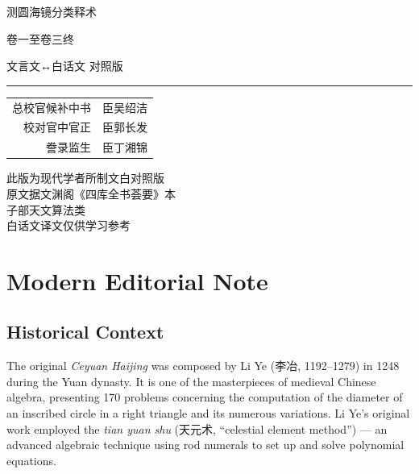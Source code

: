 \documentclass[11pt,a4paper]{article}
\newcommand{\shortline}{\noindent\rule{0.5\textwidth}{0.4pt}\par}
\newcounter{problem}[section]
\begin{document}
\thispagestyle{empty}
\begin{center}
\vspace*{3cm}
{\Large 测圆海镜分类释术}

\vspace{0.5cm}
{\large 卷一至卷三终}

\vspace{0.3cm}
{\normalsize 文言文↔白话文 对照版}

\vspace{2cm}
\shortline

\vspace{1cm}
{\normalsize
\begin{tabular}{rl}
总校官候补中书 & 臣吴绍洁 \\
校对官中官正 & 臣郭长发 \\
誊录监生 & 臣丁湘锦 \\
\end{tabular}
}

\vspace{2cm}
{\small\textcolor{notecolor}{%
此版为现代学者所制文白对照版\\
原文据文渊阁《四库全书荟要》本\\
子部天文算法类\\
白话文译文仅供学习参考
}}

\end{center}

\clearpage

\section*{Modern Editorial Note}

\subsection*{Historical Context}
The original \textit{Ceyuan Haijing} was composed by Li Ye (李冶, 1192--1279) in 1248 during the Yuan dynasty. It is one of the masterpieces of medieval Chinese algebra, presenting 170 problems concerning the computation of the diameter of an inscribed circle in a right triangle and its numerous variations. Li Ye's original work employed the \textit{tian yuan shu} (天元术, ``celestial element method'') --- an advanced algebraic technique using rod numerals to set up and solve polynomial equations.
\end{document}
